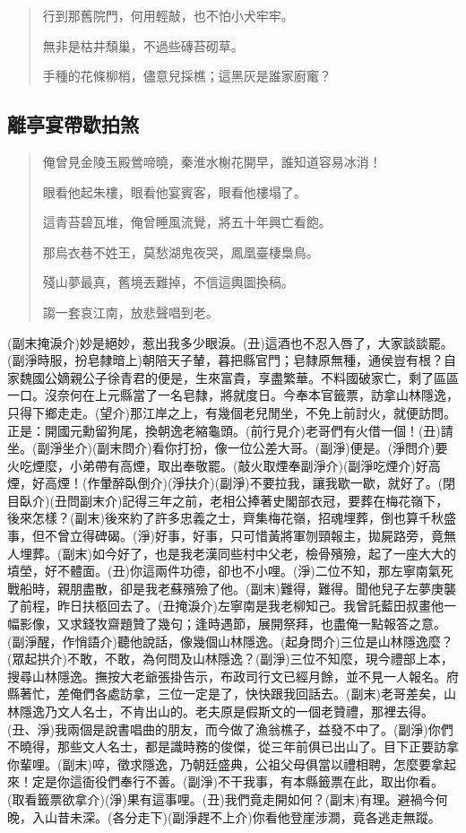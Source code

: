 \documentclass[UTF8]{ctexart}
\begin{document}
\begin{verse}
    行到那舊院門，何用輕敲，也不怕小犬牢牢。
    
    無非是枯井頹巢，不過些磚苔砌草。
    
    手種的花條柳梢，儘意兒採樵；這黑灰是誰家廚竃？
\end{verse}

\subsection{離亭宴帶歇拍煞}

\begin{verse}
    俺曾見金陵玉殿鶯啼曉，秦淮水榭花開早，誰知道容易冰消！
    
    眼看他起朱樓，眼看他宴賓客，眼看他樓塌了。
    
    這青苔碧瓦堆，俺曾睡風流覺，將五十年興亡看飽。
    
    那烏衣巷不姓王，莫愁湖鬼夜哭，鳳凰臺棲梟鳥。
    
    殘山夢最真，舊境丟難掉，不信這輿圖換稿。
    
    謅一套哀江南，放悲聲唱到老。
\end{verse}

(副末掩淚介)妙是絕妙，惹出我多少眼淚。(丑)這酒也不忍入唇了，大家談談罷。(副淨時服，扮皂隸暗上)朝陪天子輦，暮把縣官門；皂隸原無種，通侯豈有根？自家魏國公嫡親公子徐青君的便是，生來富貴，享盡繁華。不料國破家亡，剩了區區一口。沒奈何在上元縣當了一名皂隸，將就度日。今奉本官籤票，訪拿山林隱逸，只得下鄉走走。(望介)那江岸之上，有幾個老兒閒坐，不免上前討火，就便訪問。正是：開國元勳留狗尾，換朝逸老縮龜頭。(前行見介)老哥們有火借一個！(丑)請坐。(副淨坐介)(副末問介)看你打扮，像一位公差大哥。(副淨)便是。(淨問介)要火吃煙麼，小弟帶有高煙，取出奉敬罷。(敲火取煙奉副淨介)(副淨吃煙介)好高煙，好高煙！(作暈醉臥倒介)(淨扶介)(副淨)不要拉我，讓我歇一歇，就好了。(閉目臥介)(丑問副末介)記得三年之前，老相公捧著史閣部衣冠，要葬在梅花嶺下，後來怎樣？(副末)後來約了許多忠義之士，齊集梅花嶺，招魂埋葬，倒也算千秋盛事，但不曾立得碑碣。(淨)好事，好事，只可惜黃將軍刎頸報主，拋屍路旁，竟無人埋葬。(副末)如今好了，也是我老漢同些村中父老，檢骨殯殮，起了一座大大的墳塋，好不體面。(丑)你這兩件功德，卻也不小哩。(淨)二位不知，那左寧南氣死戰船時，親朋盡散，卻是我老蘇殯殮了他。(副末)難得，難得。聞他兒子左夢庚襲了前程，昨日扶柩回去了。(丑掩淚介)左寧南是我老柳知己。我曾託藍田叔畫他一幅影像，又求錢牧齋題贊了幾句；逢時遇節，展開祭拜，也盡俺一點報答之意。(副淨醒，作悄語介)聽他說話，像幾個山林隱逸。(起身問介)三位是山林隱逸麼？(眾起拱介)不敢，不敢，為何問及山林隱逸？(副淨)三位不知麼，現今禮部上本，搜尋山林隱逸。撫按大老爺張掛告示，布政司行文已經月餘，並不見一人報名。府縣著忙，差俺們各處訪拿，三位一定是了，快快跟我回話去。(副末)老哥差矣，山林隱逸乃文人名士，不肯出山的。老夫原是假斯文的一個老贊禮，那裡去得。(丑、淨)我兩個是說書唱曲的朋友，而今做了漁翁樵子，益發不中了。(副淨)你們不曉得，那些文人名士，都是識時務的俊傑，從三年前俱已出山了。目下正要訪拿你輩哩。(副末)啐，徵求隱逸，乃朝廷盛典，公祖父母俱當以禮相聘，怎麼要拿起來！定是你這衙役們奉行不善。(副淨)不干我事，有本縣籤票在此，取出你看。(取看籤票欲拿介)(淨)果有這事哩。(丑)我們竟走開如何？(副末)有理。避禍今何晚，入山昔未深。(各分走下)(副淨趕不上介)你看他登崖涉澗，竟各逃走無蹤。
\end{document}
